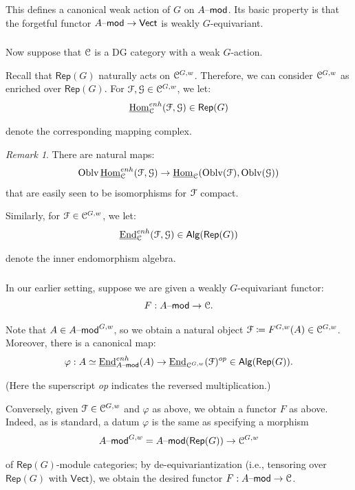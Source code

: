 \documentclass[reqno,11pt]{amsart}
\numberwithin{equation}{subsection}
\theoremstyle{remark}
\newtheorem{rem}[thm]{Remark}
\newcommand{\sC}{{\EuScript C}}
\newcommand{\sF}{{\EuScript F}}
\newcommand{\sG}{{\EuScript G}}
\newcommand{\on}{\operatorname}
\newcommand{\ul}{\underline}
\newcommand{\mathendash}{\text{\textendash}}
\newcommand{\End}{\on{End}}
\newcommand{\Hom}{\on{Hom}}
\newcommand{\Rep}{\mathsf{Rep}}
\newcommand{\vph}{\varphi}
\newcommand{\Vect}{\mathsf{Vect}}
\renewcommand{\mod}{\mathendash\mathsf{mod}}
\newcommand{\Oblv}{\on{Oblv}}
\newcommand{\Alg}{\mathsf{Alg}}
\begin{document}
This defines a canonical weak action of $G$ on $A\mod$. Its basic property is that
the forgetful functor $A\mod \to \Vect$ is weakly $G$-equivariant.

\subsubsection{}

Now suppose that $\sC$ is a DG category with a weak $G$-action. 

Recall that $\Rep(G)$ naturally acts on $\sC^{G,w}$.
Therefore, we can consider $\sC^{G,w}$ as enriched over $\Rep(G)$.
For $\sF,\sG\in \sC^{G,w}$, we let:
%
\[
\ul{\Hom}_{\sC}^{enh}(\sF,\sG) \in \Rep(G)
\]

\noindent denote the corresponding mapping complex.

\begin{rem}

There are natural maps:
%
\[
\Oblv\ul{\Hom}_{\sC}^{enh}(\sF,\sG) \to \ul{\Hom}_{\sC}(\Oblv(\sF),\Oblv(\sG))
\]
%
\noindent that are easily seen to be isomorphisms for $\sF$ compact. 

\end{rem}

Similarly, for
$\sF \in \sC^{G,w}$, we let:
%
\[
\ul{\End}_{\sC}^{enh}(\sF,\sG) \in \Alg(\Rep(G)) 
\]

\noindent denote the inner endomorphism algebra.

\subsubsection{}\label{sss:weak-functor}

In our earlier setting, suppose we are given a weakly $G$-equivariant
functor:
%
\[
F:A\mod \to \sC.
\]

\noindent Note that $A \in A\mod^{G,w}$, so we obtain a natural object 
$\sF \coloneqq F^{G,w}(A) \in \sC^{G,w}$. Moreover, there is a canonical map:
%
\[
\vph:A \simeq \ul{\End}_{A\mod}^{enh}(A) \to \ul{\End}_{\sC^{G,w}}(\sF)^{op} \in \Alg(\Rep(G)). 
\]

\noindent (Here the superscript \emph{op} indicates the reversed multiplication.) 

Conversely, given $\sF \in \sC^{G,w}$ and $\vph$ as above, we obtain a functor 
$F$ as above. Indeed, as is standard, a datum $\vph$ is the
same as specifying a morphism 
%
\[
A\mod^{G,w} = A\mod(\Rep(G)) \to \sC^{G,w} 
\]

\noindent of $\Rep(G)$-module categories; by de-equivariantization
(i.e., tensoring over $\Rep(G)$ with $\Vect$), we obtain the 
desired functor $F:A\mod \to \sC$.
\end{document}
